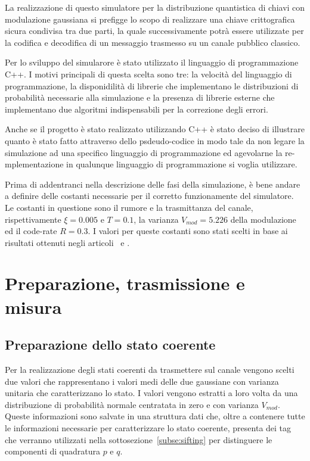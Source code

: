 La realizzazione di questo simulatore per la distribuzione quantistica di chiavi con modulazione gaussiana si prefigge lo scopo di realizzare una chiave crittografica sicura condivisa tra due parti, la quale successivamente potr\`a essere utilizzate per la codifica e decodifica di un messaggio trasmesso su un canale pubblico classico. 

Per lo sviluppo del simularore \`e stato utilizzato il linguaggio di programmazione C++. I motivi principali di questa scelta sono tre: la velocit\`a del linguaggio di programmazione, la disponidilit\`a di librerie che implementano le distribuzioni di probabilit\`a necessarie alla simulazione e la presenza di librerie esterne che implementano due algoritmi indispensabili per la correzione degli errori.

Anche se il progetto \`e stato realizzato utilizzando C++ \`e stato deciso di illustrare quanto \`e stato fatto attraverso dello psdeudo-codice in modo tale da non legare la simulazione ad una specifico linguaggio di programmazione ed agevolarne la re-mplementazione in qualunque linguaggio di programmazione si voglia utilizzare.

Prima di addentranci nella descrizione delle fasi della simulazione, \`e bene andare a definire delle costanti necessarie per il corretto funzionamente del simulatore. Le costanti in questione sono il rumore e la trasmittanza del canale, rispettivamente $\xi = 0.005$ e $T=0.1$, la varianza $V_{mod}=5.226$ della modulazione ed il code-rate $R = 0.3$. I valori per queste costanti sono stati scelti in base ai risultati ottenuti negli articoli~\cite{https://doi.org/10.1002/qute.201800011} e \cite{e24101463}.

\section{Preparazione, trasmissione e misura}

\subsection{Preparazione dello stato coerente}\label{subse:prep-stato}
Per la realizzazione degli stati coerenti da trasmettere sul canale vengono scelti due valori che rappresentano i valori medi delle due gaussiane con varianza unitaria che caratterizzano lo stato. I valori vengono estratti a loro volta da una distribuzione di probabilit\`a normale centratata in zero e con varianza $V_{mod}$. Queste informazioni sono salvate in una struttura dati che, oltre a contenere tutte le informazioni necessarie per caratterizzare lo stato coerente, presenta dei tag che verranno utilizzati nella sottosezione~\ref{subse:sifting} per distinguere le componenti di quadratura $p$ e $q$.

